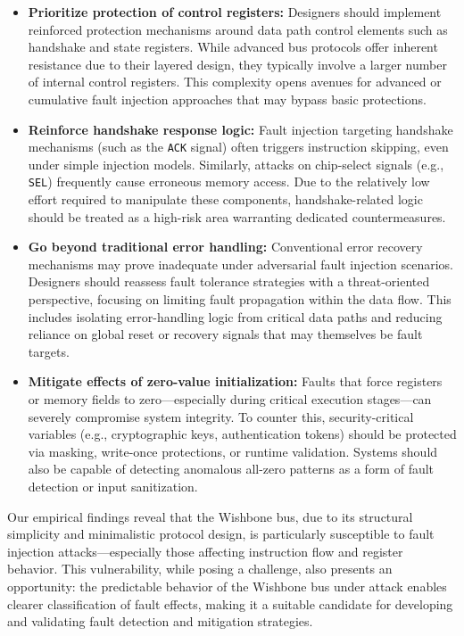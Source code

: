 \begin{itemize}
\item \textbf{Prioritize protection of control registers:} Designers should implement reinforced protection mechanisms around data path control elements such as handshake and state registers. While advanced bus protocols offer inherent resistance due to their layered design, they typically involve a larger number of internal control registers. This complexity opens avenues for advanced or cumulative fault injection approaches that may bypass basic protections.

\item \textbf{Reinforce handshake response logic:} Fault injection targeting handshake mechanisms (such as the \texttt{ACK} signal) often triggers instruction skipping, even under simple injection models. Similarly, attacks on chip-select signals (e.g., \texttt{SEL}) frequently cause erroneous memory access. Due to the relatively low effort required to manipulate these components, handshake-related logic should be treated as a high-risk area warranting dedicated countermeasures.

\item \textbf{Go beyond traditional error handling:} Conventional error recovery mechanisms may prove inadequate under adversarial fault injection scenarios. Designers should reassess fault tolerance strategies with a threat-oriented perspective, focusing on limiting fault propagation within the data flow. This includes isolating error-handling logic from critical data paths and reducing reliance on global reset or recovery signals that may themselves be fault targets.

\item \textbf{Mitigate effects of zero-value initialization:} Faults that force registers or memory fields to zero—especially during critical execution stages—can severely compromise system integrity. To counter this, security-critical variables (e.g., cryptographic keys, authentication tokens) should be protected via masking, write-once protections, or runtime validation. Systems should also be capable of detecting anomalous all-zero patterns as a form of fault detection or input sanitization.
\end{itemize}

Our empirical findings reveal that the Wishbone bus, due to its structural simplicity and minimalistic protocol design, is particularly susceptible to fault injection attacks—especially those affecting instruction flow and register behavior. This vulnerability, while posing a challenge, also presents an opportunity: the predictable behavior of the Wishbone bus under attack enables clearer classification of fault effects, making it a suitable candidate for developing and validating fault detection and mitigation strategies.

